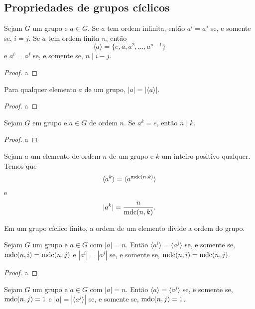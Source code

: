 \subsection*{Propriedades de grupos cíclicos}
%
\begin{theorem}
\label{teo-crit-potencias-iguais}
    Sejam $G$ um grupo e $a\in G$. Se $a$ tem ordem infinita, então $a^i = a^j$ se, e somente se, $i=j$.
    Se $a$ tem ordem finita $n$, então 
    \[
    \langle a \rangle = \{e, a, a^2, \dots, a^{n-1}\}
    \]
    e $a^i = a^j$ se, e somente se, $n\mid i-j$.
\end{theorem}
%
\begin{proof}
    a
\end{proof}
%
\begin{corollary}
\label{cor-ordem-elemento-ordem-subgrupo}
    Para qualquer elemento $a$ de um grupo, $|a| = |\langle a \rangle|$.
\end{corollary}
%
\begin{proof}
    a
\end{proof}
%
\begin{corollary}
\label{cor-num-divide-ordem}
    Sejam $G$ em grupo e $a\in G$ de ordem $n$. Se $a^k = e$, então $n\mid k$.
\end{corollary}
%
\begin{proof}
    a
\end{proof}
%
\begin{theorem}
\label{teo-ordem-gerado}
    Sejam $a$ um elemento de ordem $n$ de um grupo e $k$ um inteiro positivo qualquer.
    Temos que
    \[
    \langle a^k \rangle = \langle a^{\operatorname{mdc}(n,k)} \rangle
    \]
    e
    \[
    |a^k| = \frac{n}{\operatorname{mdc}(n,k)}.
    \]
\end{theorem}
%
\begin{corollary}
\label{cor-ordem-elemento-divide-ordem-grupo}
    Em um grupo cíclico finito, a ordem de um elemento divide a ordem do grupo.
\end{corollary}
%
\begin{corollary}
\label{cor-igualdade-subgrupos-gerados}
    Sejam $G$ um grupo e $a\in G$ com $|a|=n$. Então $\langle a^i \rangle = \langle a^j \rangle$
    se, e somente se, $\operatorname{mdc}(n,i) = \operatorname{mdc}(n,j)$ e $|a^i| = |a^j|$ se, e somente se, $\operatorname{mdc}(n,i) = \operatorname{mdc}(n,j)$.
\end{corollary}
%
\begin{proof}
    a
\end{proof}
%
\begin{corollary}
\label{cor-geradores-ciclicos}
    Sejam $G$ um grupo e $a\in G$ com $|a|=n$. Então $\langle a \rangle = \langle a^j \rangle$ se,
    e somente se, $\operatorname{mdc}(n,j) = 1$ e $|a| = |\langle a^j \rangle|$ se, e somente se, $\operatorname{mdc}(n,j) = 1$.
\end{corollary}
